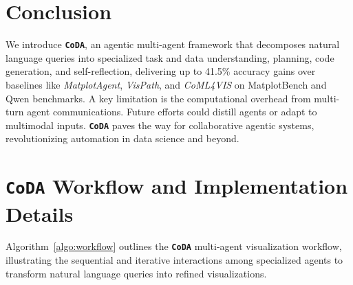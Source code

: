 \documentclass[11pt, a4paper, logo, copyright]{googlecloud}
\newcommand{\methodname}{\textbf{\texttt{\textcolor{StarIndigo}{C}\textcolor{StarIndigo}{o}\textcolor{StarCoral}{D}\textcolor{StarTeal}{A}}}}
\begin{document}
\section{Conclusion}

We introduce \methodname{}, an agentic multi-agent framework that decomposes natural language queries into specialized task and data understanding, planning, code generation, and self-reflection, delivering up to 41.5\% accuracy gains over baselines like \textit{MatplotAgent}, \textit{VisPath}, and \textit{CoML4VIS} on MatplotBench and Qwen benchmarks. 
A key limitation is the computational overhead from multi-turn agent communications. Future efforts could distill agents or adapt to multimodal inputs. \methodname{} paves the way for collaborative agentic systems, revolutionizing automation in data science and beyond.





\nobibliography*


\clearpage

\appendix




\section{\methodname{} Workflow and Implementation Details}

Algorithm~\ref{algo:workflow} outlines the \methodname{} multi-agent visualization workflow, illustrating the sequential and iterative interactions among specialized agents to transform natural language queries into refined visualizations.
\end{document}
